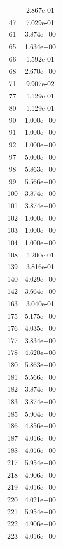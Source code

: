 \documentclass[12pt]{article}
\begin{document}
\begin{longtable}{@{}cc@{}}
\bottomrule
\endlastfoot
29 & 2.867e-01 \\
47 & 7.029e-01 \\
61 & 3.874e+00 \\
65 & 1.634e+00 \\
66 & 1.592e-01 \\
68 & 2.670e+00 \\
71 & 9.907e-02 \\
77 & 1.129e-01 \\
80 & 1.129e-01 \\
90 & 1.000e+00 \\
91 & 1.000e+00 \\
92 & 1.000e+00 \\
97 & 5.000e+00 \\
98 & 5.863e+00 \\
99 & 5.566e+00 \\
100 & 3.874e+00 \\
101 & 3.874e+00 \\
102 & 1.000e+00 \\
103 & 1.000e+00 \\
104 & 1.000e+00 \\
108 & 1.200e-01 \\
139 & 3.816e-01 \\
140 & 4.029e+00 \\
142 & 3.664e+00 \\
163 & 3.040e-01 \\
175 & 5.175e+00 \\
176 & 4.035e+00 \\
177 & 3.834e+00 \\
178 & 4.620e+00 \\
180 & 5.863e+00 \\
181 & 5.566e+00 \\
182 & 3.874e+00 \\
183 & 3.874e+00 \\
185 & 5.904e+00 \\
186 & 4.856e+00 \\
187 & 4.016e+00 \\
188 & 4.016e+00 \\
217 & 5.954e+00 \\
218 & 4.906e+00 \\
219 & 4.016e+00 \\
220 & 4.021e+00 \\
221 & 5.954e+00 \\
222 & 4.906e+00 \\
223 & 4.016e+00 \\

\end{longtable}
\end{document}
